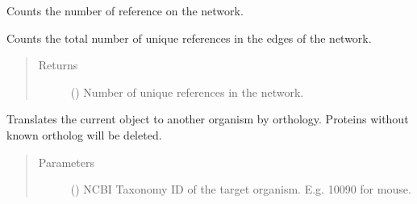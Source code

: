 \documentclass[letterpaper,10pt,english]{sphinxmanual}
\begin{document}
\begin{fulllineitems}

\begin{fulllineitems}
\label{\detokenize{reference:pypath.main.PyPath.numof_references}}
Counts the number of reference on the network.

Counts the total number of unique references in the edges of the
network.
\begin{quote}\begin{description}
\item[{Returns}] \leavevmode
() \textendash{} Number of unique references in the network.

\end{description}\end{quote}

\end{fulllineitems}


\begin{fulllineitems}
\label{\detokenize{reference:pypath.main.PyPath.numof_undirected_edges}}
\end{fulllineitems}


\begin{fulllineitems}
\label{\detokenize{reference:pypath.main.PyPath.orthology_translation}}
Translates the current object to another organism by orthology.
Proteins without known ortholog will be deleted.
\begin{quote}\begin{description}
\item[{Parameters}] \leavevmode
{} () \textendash{} NCBI Taxonomy ID of the target organism. E.g. 10090 for mouse.


\end{description}
\end{quote}
\end{fulllineitems}
\end{fulllineitems}
\end{document}
